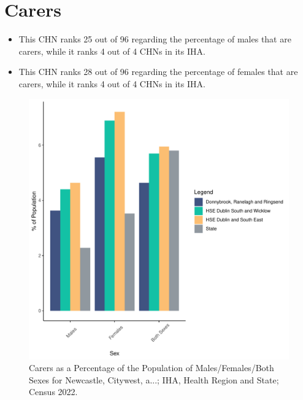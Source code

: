 \documentclass{article}
\begin{document}
\section{Carers}\label{sect:Carers}
\begin{itemize}
\item This CHN ranks  25 out of 96 regarding the percentage of males that are carers, while it ranks   4 out of 4 CHNs in its IHA.
\item This CHN ranks  28 out of 96 regarding the percentage of females that are carers, while it ranks   4 out of 4 CHNs in its IHA.
\end{itemize}
\begin{figure}[H]
	\centering
	\includegraphics[width = 150mm]{../figures/CareED.pdf}
	\caption{Carers as a Percentage of the Population of Males/Females/Both Sexes for Newcastle, Citywest, a...; IHA, Health Region and State; Census 2022.}
	\label{fig:2ae19629-1a6a-13a3-e055-000000000001}
	\end{figure}
\end{document}
